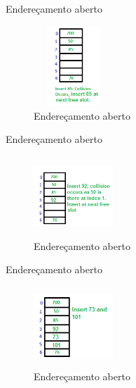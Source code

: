 \begin{frame}
	\begin{block}{Endereçamento aberto}
		\begin{figure}[!htb]
			\centering	  				
			\includegraphics[height=3cm, width = 3cm]{./pic/openAddressing14Linear.png}
			\caption{Endereçamento aberto  \cite{GEEKS_2018}}
		\end{figure}
	\end{block}
\end{frame}

\begin{frame}
	\begin{block}{Endereçamento aberto}
		\begin{figure}[!htb]
			\centering	  				
			\includegraphics[height=3cm, width = 3cm]{./pic/openAddressing15Linear.png}
			\caption{Endereçamento aberto  \cite{GEEKS_2018}}
		\end{figure}
	\end{block}
\end{frame}

\begin{frame}
	\begin{block}{Endereçamento aberto}
		\begin{figure}[!htb]
			\centering	  				
			\includegraphics[height=3cm, width = 3cm]{./pic/openAddressing16Linear.png}
			\caption{Endereçamento aberto  \cite{GEEKS_2018}}
		\end{figure}
	\end{block}
\end{frame}


